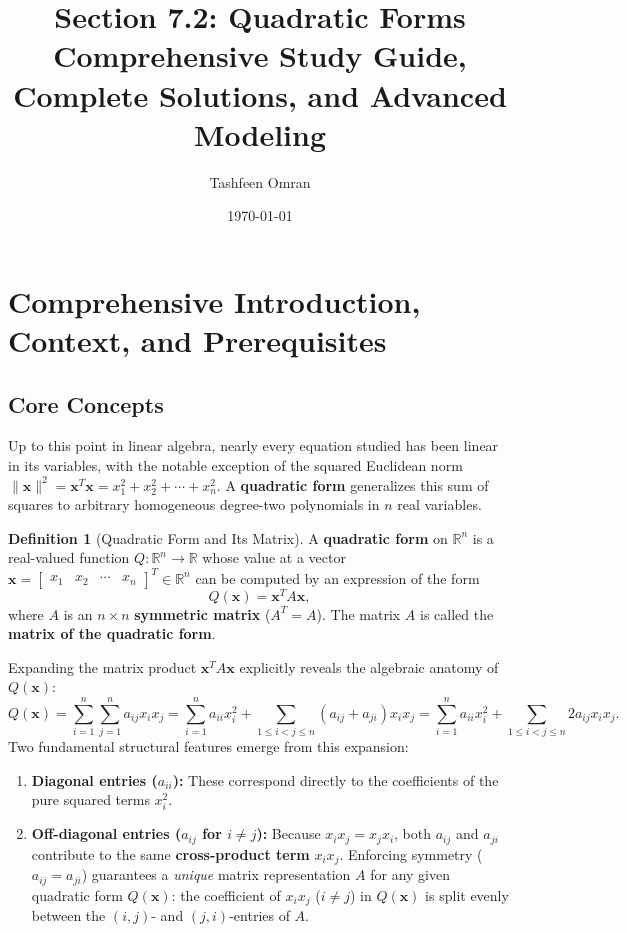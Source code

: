 \documentclass[11pt, letterpaper]{article}
\title{\textbf{Section 7.2: Quadratic Forms} \\ \large Comprehensive Study Guide, Complete Solutions, and Advanced Modeling}
\author{Tashfeen Omran}
\date{\today}
\theoremstyle{definition}
\newtheorem{definition}{Definition}[section]
\theoremstyle{remark}
\begin{document}
\maketitle
\tableofcontents
\newpage

\section{Comprehensive Introduction, Context, and Prerequisites}

\subsection{Core Concepts}

Up to this point in linear algebra, nearly every equation studied has been linear in its variables, with the notable exception of the squared Euclidean norm $\|\mathbf{x}\|^2 = \mathbf{x}^T \mathbf{x} = x_1^2 + x_2^2 + \cdots + x_n^2$. A \textbf{quadratic form} generalizes this sum of squares to arbitrary homogeneous degree-two polynomials in $n$ real variables.

\begin{definition}[Quadratic Form and Its Matrix]
A \textbf{quadratic form} on $\mathbb{R}^n$ is a real-valued function $Q : \mathbb{R}^n \to \mathbb{R}$ whose value at a vector $\mathbf{x} = \begin{bmatrix} x_1 & x_2 & \cdots & x_n \end{bmatrix}^T \in \mathbb{R}^n$ can be computed by an expression of the form
\[
Q(\mathbf{x}) = \mathbf{x}^T A \mathbf{x},
\]
where $A$ is an $n \times n$ \textbf{symmetric matrix} ($A^T = A$). The matrix $A$ is called the \textbf{matrix of the quadratic form}.
\end{definition}

Expanding the matrix product $\mathbf{x}^T A \mathbf{x}$ explicitly reveals the algebraic anatomy of $Q(\mathbf{x})$:
\[
Q(\mathbf{x}) = \sum_{i=1}^n \sum_{j=1}^n a_{ij} x_i x_j = \sum_{i=1}^n a_{ii} x_i^2 + \sum_{1 \le i < j \le n} (a_{ij} + a_{ji}) x_i x_j = \sum_{i=1}^n a_{ii} x_i^2 + \sum_{1 \le i < j \le n} 2 a_{ij} x_i x_j.
\]
Two fundamental structural features emerge from this expansion:
\begin{enumerate}
    \item \textbf{Diagonal entries ($a_{ii}$):} These correspond directly to the coefficients of the pure squared terms $x_i^2$.
    \item \textbf{Off-diagonal entries ($a_{ij}$ for $i \ne j$):} Because $x_i x_j = x_j x_i$, both $a_{ij}$ and $a_{ji}$ contribute to the same \textbf{cross-product term} $x_i x_j$. Enforcing symmetry ($a_{ij} = a_{ji}$) guarantees a \emph{unique} matrix representation $A$ for any given quadratic form $Q(\mathbf{x})$: the coefficient of $x_i x_j$ ($i \ne j$) in $Q(\mathbf{x})$ is split evenly between the $(i,j)$- and $(j,i)$-entries of $A$.
\end{enumerate}
\end{document}
